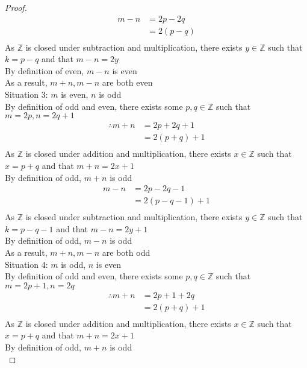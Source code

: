 \documentclass{article}
\begin{document}
\begin{proof}
     \begin{align*}
        m - n &= 2p - 2q \tag{By substitution}\\
        &= 2(p-q) \tag{By algebra}\\
    \end{align*}
    As $\mathbb{Z}$  is closed under subtraction and multiplication, there exists $y \in \mathbb{Z}$ such that $k = p-q$ and that $m - n = 2y$\\
    By definition of even, $m - n$ is even\\
    As a result, $m+n,m-n$ are both even\\

    Situation 3: $m$ is even, $n $ is odd\\
     By definition of odd and even, there exists some $p,q \in \mathbb{Z}$ such that $m = 2p, n = 2q+1$\\
    \begin{align*}
        \therefore
        m + n &= 2p + 2q + 1\tag{By substitution}\\
        &= 2(p+q) +1\tag{By algebra}\\
    \end{align*}
    As $\mathbb{Z}$  is closed under addition and multiplication, there exists $x \in \mathbb{Z}$ such that $x = p+q$ and that $m + n = 2x + 1$\\
    By definition of odd, $m + n$ is odd\\
    
    \begin{align*}
        m - n &= 2p - 2q -1\tag{By substitution}\\
        &= 2(p-q-1) +1\tag{By algebra}\\
    \end{align*}
    As $\mathbb{Z}$  is closed under subtraction and multiplication, there exists $y \in \mathbb{Z}$ such that $k = p-q - 1$ and that $m - n = 2y + 1$\\
    By definition of odd, $m - n$ is odd\\
    As a result, $m+n,m-n$ are both odd\\

    Situation 4: $m$ is odd, $n $ is even\\
     By definition of odd and even, there exists some $p,q \in \mathbb{Z}$ such that $m = 2p + 1, n = 2q$\\
    \begin{align*}
        \therefore
        m + n &= 2p + 1 + 2q\tag{By substitution}\\
        &= 2(p+q) +1\tag{By algebra}\\
    \end{align*}
    As $\mathbb{Z}$  is closed under addition and multiplication, there exists $x \in \mathbb{Z}$ such that $x = p+q$ and that $m + n = 2x + 1$\\
    By definition of odd, $m + n$ is odd\\
    

\end{proof}
\end{document}
